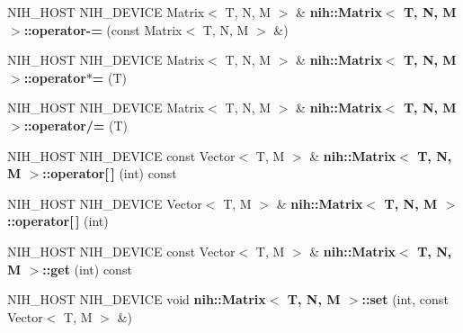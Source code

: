 \begin{DoxyCompactItemize}
\item 
\hypertarget{group__linalg_gabb807e11d90f62076f083093ed4852c4}{
\-N\-I\-H\-\_\-\-H\-O\-S\-T \-N\-I\-H\-\_\-\-D\-E\-V\-I\-C\-E \-Matrix$<$ \-T, \*
\-N, \-M $>$ \& {\bfseries nih\-::\-Matrix$<$ T, N, M $>$\-::operator-\/=} (const \-Matrix$<$ \-T, \-N, \-M $>$ \&)}
\label{group__linalg_gabb807e11d90f62076f083093ed4852c4}

\item 
\hypertarget{group__linalg_ga2f749df29033f0659b3de33cca270b1d}{
\-N\-I\-H\-\_\-\-H\-O\-S\-T \-N\-I\-H\-\_\-\-D\-E\-V\-I\-C\-E \-Matrix$<$ \-T, \*
\-N, \-M $>$ \& {\bfseries nih\-::\-Matrix$<$ T, N, M $>$\-::operator$\ast$=} (\-T)}
\label{group__linalg_ga2f749df29033f0659b3de33cca270b1d}

\item 
\hypertarget{group__linalg_ga0b8324135764fc785a39bcc7737c53f2}{
\-N\-I\-H\-\_\-\-H\-O\-S\-T \-N\-I\-H\-\_\-\-D\-E\-V\-I\-C\-E \-Matrix$<$ \-T, \*
\-N, \-M $>$ \& {\bfseries nih\-::\-Matrix$<$ T, N, M $>$\-::operator/=} (\-T)}
\label{group__linalg_ga0b8324135764fc785a39bcc7737c53f2}

\item 
\hypertarget{group__linalg_ga7d8d41af5d8c106a2a62c27c6271c318}{
\-N\-I\-H\-\_\-\-H\-O\-S\-T \-N\-I\-H\-\_\-\-D\-E\-V\-I\-C\-E const \*
\-Vector$<$ \-T, \-M $>$ \& {\bfseries nih\-::\-Matrix$<$ T, N, M $>$\-::operator\mbox{[}$\,$\mbox{]}} (int) const }
\label{group__linalg_ga7d8d41af5d8c106a2a62c27c6271c318}

\item 
\hypertarget{group__linalg_ga4925f21801c31cc9388d6f8eb1f4ab96}{
\-N\-I\-H\-\_\-\-H\-O\-S\-T \-N\-I\-H\-\_\-\-D\-E\-V\-I\-C\-E \-Vector$<$ \-T, \*
\-M $>$ \& {\bfseries nih\-::\-Matrix$<$ T, N, M $>$\-::operator\mbox{[}$\,$\mbox{]}} (int)}
\label{group__linalg_ga4925f21801c31cc9388d6f8eb1f4ab96}

\item 
\hypertarget{group__linalg_ga395ae2b1d7ac2d89345384ccbe8a76ae}{
\-N\-I\-H\-\_\-\-H\-O\-S\-T \-N\-I\-H\-\_\-\-D\-E\-V\-I\-C\-E const \*
\-Vector$<$ \-T, \-M $>$ \& {\bfseries nih\-::\-Matrix$<$ T, N, M $>$\-::get} (int) const }
\label{group__linalg_ga395ae2b1d7ac2d89345384ccbe8a76ae}

\item 
\hypertarget{group__linalg_gaecc60423b4fcded657b4f9bf42e25c5c}{
\-N\-I\-H\-\_\-\-H\-O\-S\-T \-N\-I\-H\-\_\-\-D\-E\-V\-I\-C\-E void {\bfseries nih\-::\-Matrix$<$ T, N, M $>$\-::set} (int, const \-Vector$<$ \-T, \-M $>$ \&)}
\label{group__linalg_gaecc60423b4fcded657b4f9bf42e25c5c}


\end{DoxyCompactItemize}
